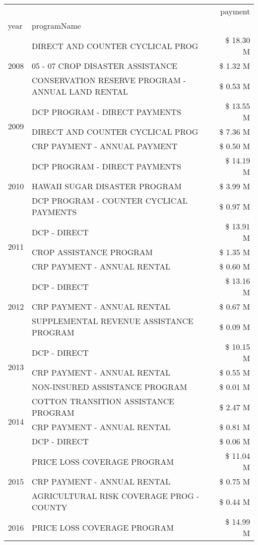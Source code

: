 \begin{tabular}{llr}
\toprule
 &  & payment \\
year & programName &  \\
\midrule
\multirow[t]{3}{*}{2008} & DIRECT AND COUNTER CYCLICAL PROG & \$ 18.30 M \\
 & 05 - 07 CROP DISASTER ASSISTANCE & \$ 1.32 M \\
 & CONSERVATION RESERVE PROGRAM - ANNUAL LAND RENTAL & \$ 0.53 M \\
\cline{1-3}
\multirow[t]{3}{*}{2009} & DCP PROGRAM - DIRECT PAYMENTS & \$ 13.55 M \\
 & DIRECT AND COUNTER CYCLICAL PROG & \$ 7.36 M \\
 & CRP PAYMENT - ANNUAL PAYMENT & \$ 0.50 M \\
\cline{1-3}
\multirow[t]{3}{*}{2010} & DCP PROGRAM - DIRECT PAYMENTS & \$ 14.19 M \\
 & HAWAII SUGAR DISASTER PROGRAM & \$ 3.99 M \\
 & DCP PROGRAM - COUNTER CYCLICAL PAYMENTS & \$ 0.97 M \\
\cline{1-3}
\multirow[t]{3}{*}{2011} & DCP - DIRECT & \$ 13.91 M \\
 & CROP ASSISTANCE PROGRAM & \$ 1.35 M \\
 & CRP PAYMENT - ANNUAL RENTAL & \$ 0.60 M \\
\cline{1-3}
\multirow[t]{3}{*}{2012} & DCP - DIRECT & \$ 13.16 M \\
 & CRP PAYMENT - ANNUAL RENTAL & \$ 0.67 M \\
 & SUPPLEMENTAL REVENUE ASSISTANCE PROGRAM & \$ 0.09 M \\
\cline{1-3}
\multirow[t]{3}{*}{2013} & DCP - DIRECT & \$ 10.15 M \\
 & CRP PAYMENT - ANNUAL RENTAL & \$ 0.55 M \\
 & NON-INSURED ASSISTANCE PROGRAM & \$ 0.01 M \\
\cline{1-3}
\multirow[t]{3}{*}{2014} & COTTON TRANSITION ASSISTANCE PROGRAM & \$ 2.47 M \\
 & CRP PAYMENT - ANNUAL RENTAL & \$ 0.81 M \\
 & DCP - DIRECT & \$ 0.06 M \\
\cline{1-3}
\multirow[t]{3}{*}{2015} & PRICE LOSS COVERAGE PROGRAM & \$ 11.04 M \\
 & CRP PAYMENT - ANNUAL RENTAL & \$ 0.75 M \\
 & AGRICULTURAL RISK COVERAGE PROG - COUNTY & \$ 0.44 M \\
\cline{1-3}
\multirow[t]{3}{*}{2016} & PRICE LOSS COVERAGE PROGRAM & \$ 14.99 M \\

\end{tabular}

